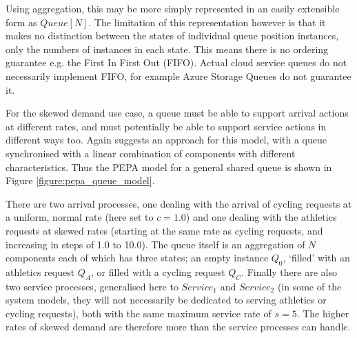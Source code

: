 \documentclass[runningheads]{llncs}
\begin{document}
Using aggregation, this may be more simply represented in an easily extensible form as $\mathit{Queue[N]}$.  The limitation of this representation however is that it makes no distinction between the states of individual queue position instances, only the numbers of instances in each state.  This means there is no ordering guarantee e.g. the First In First Out (FIFO).  Actual cloud service queues do not necessarily implement FIFO, for example Azure Storage Queues \cite{RN1072} do not guarantee it.

For the skewed demand use case, a queue must be able to support arrival actions at different rates, and must potentially be able to support service actions in different ways too.  Again \cite{RN75} suggests an approach for this model, with a queue synchronised with a linear combination of components with different characteristics.  Thus the PEPA model for a general shared queue is shown in Figure \ref{figure:pepa_queue_model}.

There are two arrival processes, one dealing with the arrival of cycling requests at a uniform, normal rate (here set to $\mathit{c=1.0}$) and one dealing with the athletics requests at skewed rates (starting at the same rate as cycling requests, and increasing in steps of 1.0 to 10.0).  The queue itself is an aggregation of $\mathit{N}$ components each of which has three states; an empty instance $\mathit{Q_0}$, `filled' with an athletics request $\mathit{Q_A}$, or filled with a cycling request $\mathit{Q_C}$.  Finally there are also two service processes, generalised here to $\mathit{Service_1}$ and $\mathit{Service_2}$ (in some of the system models, they will not necessarily be dedicated to serving athletics or cycling requests), both with the same maximum service rate of $\mathit{s=5}$.  The higher rates of skewed demand are therefore more than the service processes can handle.
\end{document}

